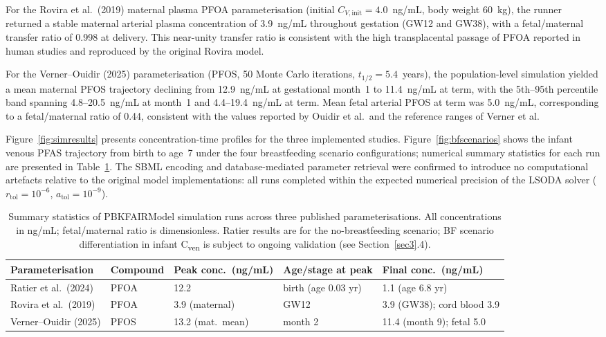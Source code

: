 \documentclass[preprint,12pt]{elsarticle}
\begin{document}
\begin{linenumbers}
For the Rovira et al.\ (2019) maternal plasma PFOA parameterisation (initial $C_{V,\mathrm{init}}=4.0$~ng/mL, body weight 60~kg), the runner returned a stable maternal arterial plasma concentration of 3.9~ng/mL throughout gestation (GW12 and GW38), with a fetal/maternal transfer ratio of 0.998 at delivery. This near-unity transfer ratio is consistent with the high transplacental passage of PFOA reported in human studies and reproduced by the original Rovira model.

For the Verner--Ouidir (2025) parameterisation (PFOS, 50 Monte Carlo iterations, $t_{1/2}=5.4$~years), the population-level simulation yielded a mean maternal PFOS trajectory declining from 12.9~ng/mL at gestational month~1 to 11.4~ng/mL at term, with the 5th--95th percentile band spanning 4.8--20.5~ng/mL at month~1 and 4.4--19.4~ng/mL at term. Mean fetal arterial PFOS at term was 5.0~ng/mL, corresponding to a fetal/maternal ratio of 0.44, consistent with the values reported by Ouidir et al.\ and the reference ranges of Verner et al.

Figure~\ref{fig:simresults} presents concentration-time profiles for the three implemented studies. Figure~\ref{fig:bfscenarios} shows the infant venous PFAS trajectory from birth to age~7 under the four breastfeeding scenario configurations; numerical summary statistics for each run are presented in Table~\ref{tab:sim_summary}. The SBML encoding and database-mediated parameter retrieval were confirmed to introduce no computational artefacts relative to the original model implementations: all runs completed within the expected numerical precision of the LSODA solver ($r_\mathrm{tol}=10^{-6}$, $a_\mathrm{tol}=10^{-9}$).

\begin{table}[h]
\centering
\caption{Summary statistics of PBKFAIRModel simulation runs across three published parameterisations. All concentrations in ng/mL; fetal/maternal ratio is dimensionless. Ratier results are for the no-breastfeeding scenario; BF scenario differentiation in infant C\textsubscript{ven} is subject to ongoing validation (see Section~\ref{sec3}.4).}
\label{tab:sim_summary}
\small
\begin{tabular}{p{2.8cm} p{1.8cm} p{1.8cm} p{2.0cm} p{2.2cm}}
\toprule
\textbf{Parameterisation} & \textbf{Compound} & \textbf{Peak conc.\ (ng/mL)} & \textbf{Age/stage at peak} & \textbf{Final conc.\ (ng/mL)} \\
\midrule
Ratier et al.\ (2024) & PFOA & 12.2 & birth (age 0.03 yr) & 1.1 (age 6.8 yr) \\[3pt]
Rovira et al.\ (2019) & PFOA & 3.9 (maternal) & GW12 & 3.9 (GW38); cord blood 3.9 \\[3pt]
Verner--Ouidir (2025) & PFOS & 13.2 (mat.\ mean) & month 2 & 11.4 (month 9); fetal 5.0 \\
\bottomrule
\end{tabular}
\end{table}


\end{linenumbers}
\end{document}
